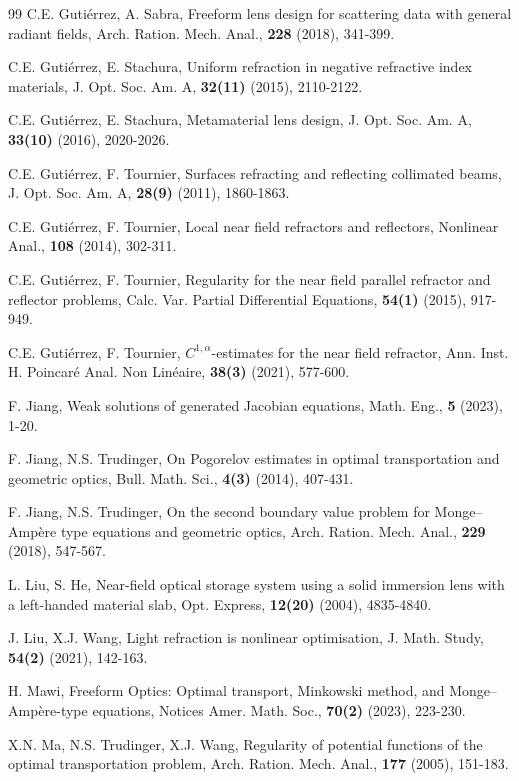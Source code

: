 \documentclass[a4paper,12pt,]{article}
\numberwithin{equation}{section}
\numberwithin{equation}{section} \allowdisplaybreaks
\begin{document}
\begin{thebibliography}{99}
 C.E. Gutiérrez, A. Sabra, Freeform lens design for scattering data with general radiant fields, Arch. Ration. Mech. Anal., \textbf{228} (2018), 341-399.

 C.E. Gutiérrez, E. Stachura, Uniform refraction in negative refractive index materials, J. Opt. Soc. Am. A, \textbf{32(11)} (2015), 2110-2122.

 C.E. Gutiérrez, E. Stachura, Metamaterial lens design, J. Opt. Soc. Am. A, \textbf{33(10)} (2016), 2020-2026.

 C.E. Gutiérrez, F. Tournier, Surfaces refracting and reflecting collimated beams, J. Opt. Soc. Am. A, \textbf{28(9)} (2011), 1860-1863.

 C.E. Gutiérrez, F. Tournier, Local near field refractors and reflectors, Nonlinear Anal., \textbf{108} (2014), 302-311.

 C.E. Gutiérrez, F. Tournier, Regularity for the near field parallel refractor and reflector problems, Calc. Var. Partial Differential Equations, \textbf{54(1)} (2015), 917-949.

 C.E. Gutiérrez, F. Tournier, $C^{1,\alpha}$-estimates for the near field refractor, Ann. Inst. H. Poincaré Anal. Non Linéaire, \textbf{38(3)} (2021), 577-600.

 F. Jiang, Weak solutions of generated Jacobian equations, Math. Eng., \textbf{5} (2023), 1-20. 

 F. Jiang, N.S. Trudinger, On Pogorelov estimates in optimal transportation and geometric optics, Bull. Math. Sci., \textbf{4(3)} (2014), 407-431.

 F. Jiang, N.S. Trudinger, On the second boundary value problem for Monge–Ampère type equations and geometric optics, Arch. Ration. Mech. Anal., \textbf{229} (2018), 547-567.

 L. Liu, S. He, Near-field optical storage system using a solid immersion lens with a left-handed material slab, Opt. Express, \textbf{12(20)} (2004), 4835-4840.

 J. Liu, X.J. Wang, Light refraction is nonlinear optimisation, J. Math. Study, \textbf{54(2)} (2021), 142-163.

 H. Mawi, Freeform Optics: Optimal transport, Minkowski method, and Monge–Ampère-type equations, Notices Amer. Math. Soc., \textbf{70(2)} (2023), 223-230.

 X.N. Ma, N.S. Trudinger, X.J. Wang, Regularity of potential functions of the optimal transportation problem, Arch. Ration. Mech. Anal., \textbf{177} (2005), 151-183.


\end{thebibliography}
\end{document}
